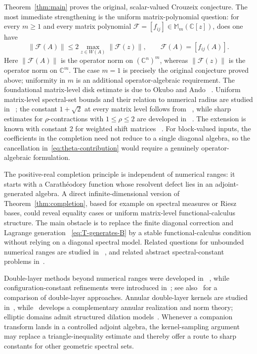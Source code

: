 \documentclass[preprints,article,submit,oneauthor]{Definitions/mdpi}
\theoremstyle{mdpi}
\theoremstyle{definition}
\newcommand{\C}{\mathbb C}
\begin{document}
Theorem~\ref{thm:main} proves the original, scalar-valued Crouzeix
conjecture.  The most immediate strengthening is the uniform
matrix-polynomial question: for every
$m\geq1$ and every matrix polynomial
$\mathcal F=[f_{ij}]\in\mathbb M_m(\C[z])$, does one have
\begin{equation}
  \lVert\mathcal F(A)\rVert
  \leq2\max_{z\in W(A)}\lVert\mathcal F(z)\rVert,
  \qquad \mathcal F(A)=[f_{ij}(A)].
  \label{eq:uniform-matrix-polynomial-extension}
\end{equation}
Here $\lVert\mathcal F(A)\rVert$ is the operator norm on $(\C^n)^m$,
whereas $\lVert\mathcal F(z)\rVert$ is the operator norm on $\C^m$.
The case $m=1$ is precisely the original conjecture proved above;
uniformity in $m$ is an additional operator-algebraic requirement.  The
foundational matrix-level disk estimate is due to Okubo and Ando~%
\cite{OkuboAndo1975}.  Uniform matrix-level spectral-set bounds and
their relation to numerical radius are studied in~%
\cite{DavidsonPaulsenWoerdeman2018,HartzMcCarthy2026}; the constant
$1+\sqrt2$ at every matrix level follows from~%
\cite{CrouzeixPalencia2017}, while sharp estimates for
$\rho$-contractions with $1\leq\rho\leq2$ are developed in~%
\cite{SchwenningerDeVriesRho2025}.  The extension is
known with constant $2$ for weighted shift matrices~%
\cite{CrouzeixGreenbaum2025}.  For block-valued inputs, the coefficients
in the completion need not reduce to a single diagonal algebra, so the
cancellation in~\eqref{eq:theta-contribution} would require a genuinely
operator-algebraic formulation.

The positive-real completion principle is independent of numerical
ranges: it starts with a Carath\'eodory function whose resolvent defect
lies in an adjoint-generated algebra.  A direct infinite-dimensional
version of Theorem~\ref{thm:completion},
based for example on spectral measures or Riesz bases, could reveal
equality cases or uniform matrix-level functional-calculus structure.
The main obstacle is to
replace the finite diagonal correction and Lagrange generation~%
\eqref{eq:T-generates-B} by a stable functional-calculus condition
without relying on a diagonal spectral model.
Related questions for unbounded numerical ranges are studied in~%
\cite{CrouzeixUnbounded2025}, and related abstract spectral-constant
problems in~\cite{SchwenningerDeVries2024,BlazhkoEtAl2025}.

Double-layer methods beyond numerical ranges were developed in~%
\cite{CrouzeixGreenbaum2019}, while configuration-constant refinements
were introduced in~\cite{MalmanEtAl2025}; see also~%
\cite{SchwenningerDeVries2025} for a comparison of double-layer
approaches.
Annular double-layer kernels are studied in~\cite{JuryTsikalas2024},
while~\cite{AglerLykovaYoung2025} develops a complementary annular
realization and norm theory; elliptic domains admit structured dilation
models~\cite{AglerLykovaYoung2024}.  Whenever a companion transform
lands in a controlled adjoint algebra, the kernel-sampling argument may
replace a triangle-inequality estimate and thereby offer a route to
sharp constants for other geometric spectral sets.
\end{document}
